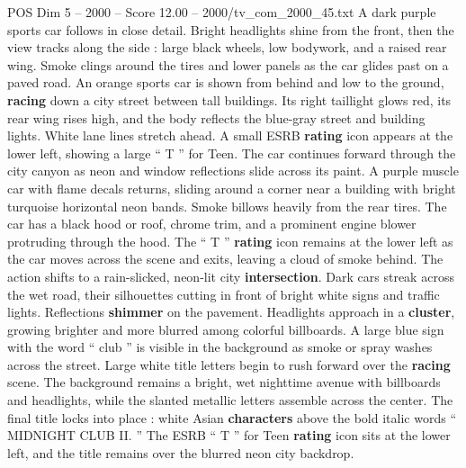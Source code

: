 \begin{textsample}{POS Dim 5 – 2000 – Score 12.00 – 2000/tv\_com\_2000\_45.txt}
A dark purple sports car follows in close detail.
Bright headlights shine from the front, then the view tracks along the side : large black wheels, low bodywork, and a raised rear wing.
Smoke clings around the tires and lower panels as the car glides past on a paved road.
An orange sports car is shown from behind and low to the ground, \textbf{racing} down a city street between tall buildings.
Its right taillight glows red, its rear wing rises high, and the body reflects the blue-gray street and building lights.
White lane lines stretch ahead.
A small ESRB \textbf{rating} icon appears at the lower left, showing a large “ T ” for Teen.
The car continues forward through the city canyon as neon and window reflections slide across its paint.
A purple muscle car with flame decals returns, sliding around a corner near a building with bright turquoise horizontal neon bands.
Smoke billows heavily from the rear tires.
The car has a black hood or roof, chrome trim, and a prominent engine blower protruding through the hood.
The “ T ” \textbf{rating} icon remains at the lower left as the car moves across the scene and exits, leaving a cloud of smoke behind.
The action shifts to a rain-slicked, neon-lit city \textbf{intersection}.
Dark cars streak across the wet road, their silhouettes cutting in front of bright white signs and traffic lights.
Reflections \textbf{shimmer} on the pavement.
Headlights approach in a \textbf{cluster}, growing brighter and more blurred among colorful billboards.
A large blue sign with the word “ club ” is visible in the background as smoke or spray washes across the street.
Large white title letters begin to rush forward over the \textbf{racing} scene.
The background remains a bright, wet nighttime avenue with billboards and headlights, while the slanted metallic letters assemble across the center.
The final title locks into place : white Asian \textbf{characters} above the bold italic words “ MIDNIGHT CLUB II. ” The ESRB “ T ” for Teen \textbf{rating} icon sits at the lower left, and the title remains over the blurred neon city backdrop.

\end{textsample}
